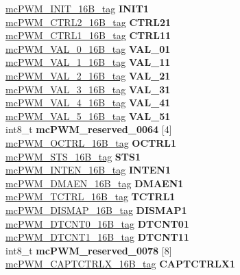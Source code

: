 \begin{DoxyCompactItemize}
\begin{tabbing}
\>\>\mbox{\hyperlink{unionmcPWM__INIT__16B__tag}{mcPWM\_INIT\_16B\_tag}} {\bfseries INIT1}\\
\>\>\mbox{\hyperlink{unionmcPWM__CTRL2__16B__tag}{mcPWM\_CTRL2\_16B\_tag}} {\bfseries CTRL21}\\
\>\>\mbox{\hyperlink{unionmcPWM__CTRL1__16B__tag}{mcPWM\_CTRL1\_16B\_tag}} {\bfseries CTRL11}\\
\>\>\mbox{\hyperlink{unionmcPWM__VAL__0__16B__tag}{mcPWM\_VAL\_0\_16B\_tag}} {\bfseries VAL\_01}\\
\>\>\mbox{\hyperlink{unionmcPWM__VAL__1__16B__tag}{mcPWM\_VAL\_1\_16B\_tag}} {\bfseries VAL\_11}\\
\>\>\mbox{\hyperlink{unionmcPWM__VAL__2__16B__tag}{mcPWM\_VAL\_2\_16B\_tag}} {\bfseries VAL\_21}\\
\>\>\mbox{\hyperlink{unionmcPWM__VAL__3__16B__tag}{mcPWM\_VAL\_3\_16B\_tag}} {\bfseries VAL\_31}\\
\>\>\mbox{\hyperlink{unionmcPWM__VAL__4__16B__tag}{mcPWM\_VAL\_4\_16B\_tag}} {\bfseries VAL\_41}\\
\>\>\mbox{\hyperlink{unionmcPWM__VAL__5__16B__tag}{mcPWM\_VAL\_5\_16B\_tag}} {\bfseries VAL\_51}\\
\>\>int8\_t {\bfseries mcPWM\_reserved\_0064} \mbox{[}4\mbox{]}\\
\>\>\mbox{\hyperlink{unionmcPWM__OCTRL__16B__tag}{mcPWM\_OCTRL\_16B\_tag}} {\bfseries OCTRL1}\\
\>\>\mbox{\hyperlink{unionmcPWM__STS__16B__tag}{mcPWM\_STS\_16B\_tag}} {\bfseries STS1}\\
\>\>\mbox{\hyperlink{unionmcPWM__INTEN__16B__tag}{mcPWM\_INTEN\_16B\_tag}} {\bfseries INTEN1}\\
\>\>\mbox{\hyperlink{unionmcPWM__DMAEN__16B__tag}{mcPWM\_DMAEN\_16B\_tag}} {\bfseries DMAEN1}\\
\>\>\mbox{\hyperlink{unionmcPWM__TCTRL__16B__tag}{mcPWM\_TCTRL\_16B\_tag}} {\bfseries TCTRL1}\\
\>\>\mbox{\hyperlink{unionmcPWM__DISMAP__16B__tag}{mcPWM\_DISMAP\_16B\_tag}} {\bfseries DISMAP1}\\
\>\>\mbox{\hyperlink{unionmcPWM__DTCNT0__16B__tag}{mcPWM\_DTCNT0\_16B\_tag}} {\bfseries DTCNT01}\\
\>\>\mbox{\hyperlink{unionmcPWM__DTCNT1__16B__tag}{mcPWM\_DTCNT1\_16B\_tag}} {\bfseries DTCNT11}\\
\>\>int8\_t {\bfseries mcPWM\_reserved\_0078} \mbox{[}8\mbox{]}\\
\>\>\mbox{\hyperlink{unionmcPWM__CAPTCTRLX__16B__tag}{mcPWM\_CAPTCTRLX\_16B\_tag}} {\bfseries CAPTCTRLX1}\\

\end{tabbing}
\end{DoxyCompactItemize}
